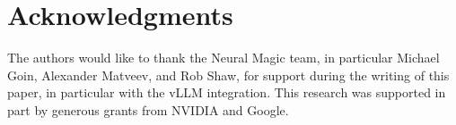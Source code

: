\documentclass{article}
\theoremstyle{plain}
\theoremstyle{definition}
\theoremstyle{remark}
\begin{document}
\section*{Acknowledgments}

The authors would like to thank the Neural Magic team, in particular Michael Goin, Alexander Matveev, and Rob Shaw, for support during the writing of this paper, in particular with the vLLM integration. This research was supported in part by generous grants from NVIDIA and Google. 











\end{document}
